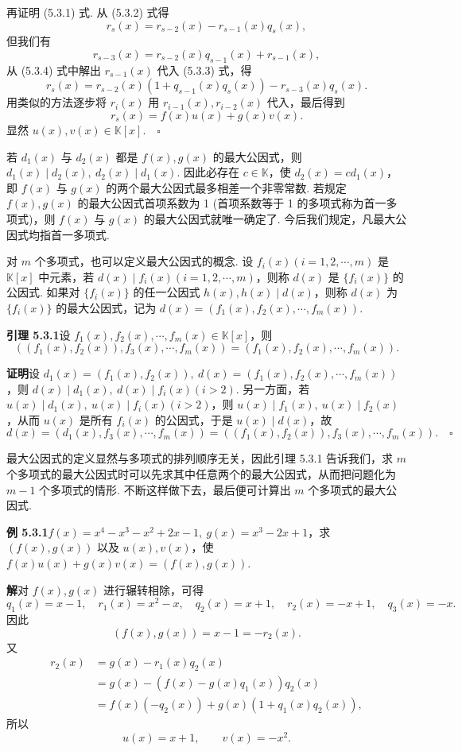 \documentclass[UTF8,12pt,a4paper,fontset=fandol]{ctexart}
\begin{document}
再证明 (5.3.1) 式. 从 (5.3.2) 式得
\begin{equation}
r_s(x)=r_{s-2}(x)-r_{s-1}(x)q_s(x),
\tag{5.3.3}
\end{equation}
但我们有
\begin{equation}
r_{s-3}(x)=r_{s-2}(x)q_{s-1}(x)+r_{s-1}(x),
\tag{5.3.4}
\end{equation}
从 (5.3.4) 式中解出 $r_{s-1}(x)$ 代入 (5.3.3) 式，得
\[
r_s(x)=r_{s-2}(x)(1+q_{s-1}(x)q_s(x))-r_{s-3}(x)q_s(x).
\]
用类似的方法逐步将 $r_i(x)$ 用 $r_{i-1}(x),r_{i-2}(x)$ 代入，最后得到
\[
r_s(x)=f(x)u(x)+g(x)v(x).
\]
显然 $u(x),v(x)\in\mathbb{K}[x].\quad \square$

若 $d_1(x)$ 与 $d_2(x)$ 都是 $f(x),g(x)$ 的最大公因式，则 $d_1(x)\mid d_2(x),\ d_2(x)\mid d_1(x)$. 因此必存在 $c\in\mathbb{K}$，使 $d_2(x)=cd_1(x)$，即 $f(x)$ 与 $g(x)$ 的两个最大公因式最多相差一个非零常数. 若规定 $f(x),g(x)$ 的最大公因式首项系数为 1 (首项系数等于 1 的多项式称为首一多项式)，则 $f(x)$ 与 $g(x)$ 的最大公因式就唯一确定了. 今后我们规定，凡最大公因式均指首一多项式.

对 $m$ 个多项式，也可以定义最大公因式的概念. 设 $f_i(x)(i=1,2,\cdots,m)$ 是 $\mathbb{K}[x]$ 中元素，若 $d(x)\mid f_i(x)(i=1,2,\cdots,m)$，则称 $d(x)$ 是 $\{f_i(x)\}$ 的公因式. 如果对 $\{f_i(x)\}$ 的任一公因式 $h(x),h(x)\mid d(x)$，则称 $d(x)$ 为 $\{f_i(x)\}$ 的最大公因式，记为 $d(x)=(f_1(x),f_2(x),\cdots,f_m(x))$.

\noindent\textbf{引理 5.3.1}\quad 设 $f_1(x),f_2(x),\cdots,f_m(x)\in\mathbb{K}[x]$，则
\[
((f_1(x),f_2(x)),f_3(x),\cdots,f_m(x))=(f_1(x),f_2(x),\cdots,f_m(x)).
\]

\noindent\textbf{证明}\quad 设 $d_1(x)=(f_1(x),f_2(x)),\ d(x)=(f_1(x),f_2(x),\cdots,f_m(x))$，则 $d(x)\mid d_1(x),\ d(x)\mid f_i(x)(i>2)$. 另一方面，若 $u(x)\mid d_1(x),\ u(x)\mid f_i(x)(i>2)$，则 $u(x)\mid f_1(x),\ u(x)\mid f_2(x)$，从而 $u(x)$ 是所有 $f_i(x)$ 的公因式，于是 $u(x)\mid d(x)$，故
\[
d(x)=(d_1(x),f_3(x),\cdots,f_m(x))=((f_1(x),f_2(x)),f_3(x),\cdots,f_m(x)).\quad \square
\]

最大公因式的定义显然与多项式的排列顺序无关，因此引理 5.3.1 告诉我们，求 $m$ 个多项式的最大公因式时可以先求其中任意两个的最大公因式，从而把问题化为 $m-1$ 个多项式的情形. 不断这样做下去，最后便可计算出 $m$ 个多项式的最大公因式.

\noindent\textbf{例 5.3.1}\quad $f(x)=x^4-x^3-x^2+2x-1,\ g(x)=x^3-2x+1$，求 $(f(x),g(x))$ 以及 $u(x),v(x)$，使 $f(x)u(x)+g(x)v(x)=(f(x),g(x))$.

\noindent\textbf{解}\quad 对 $f(x),g(x)$ 进行辗转相除，可得
\[
q_1(x)=x-1,\quad r_1(x)=x^2-x,\quad q_2(x)=x+1,\quad r_2(x)=-x+1,\quad q_3(x)=-x.
\]
因此
\[
(f(x),g(x))=x-1=-r_2(x).
\]
又
\[
\begin{aligned}
r_2(x)&=g(x)-r_1(x)q_2(x)\\
&=g(x)-(f(x)-g(x)q_1(x))q_2(x)\\
&=f(x)(-q_2(x))+g(x)(1+q_1(x)q_2(x)),
\end{aligned}
\]
所以
\[
u(x)=x+1,\qquad v(x)=-x^2.
\]
\end{document}
